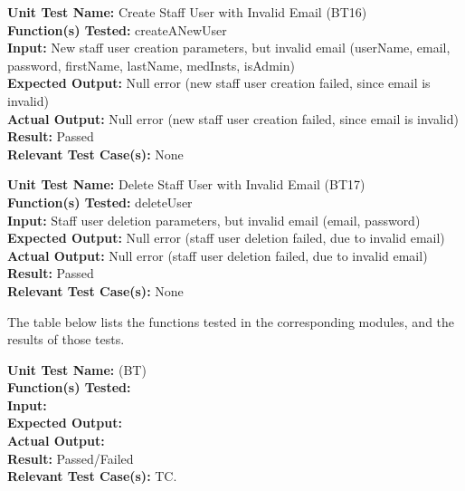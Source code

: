 \documentclass[12pt, titlepage]{article}
\begin{document}
\begin{mdframed}[linewidth=0.5mm]
  \textbf{Unit Test Name:} Create Staff User with Invalid Email (BT16) \\
  \textbf{Function(s) Tested:} createANewUser \\
  \textbf{Input:} New staff user creation parameters, but invalid email (userName, email, password, firstName, lastName, medInsts, isAdmin) \\
  \textbf{Expected Output:} Null error (new staff user creation failed, since email is invalid) \\
  \textbf{Actual Output:} Null error (new staff user creation failed, since email is invalid) \\
  \textbf{Result:} Passed \\
  \textbf{Relevant Test Case(s):} None
\end{mdframed}

\begin{mdframed}[linewidth=0.5mm]
  \textbf{Unit Test Name:} Delete Staff User with Invalid Email (BT17) \\
  \textbf{Function(s) Tested:} deleteUser \\
  \textbf{Input:} Staff user deletion parameters, but invalid email (email, password) \\
  \textbf{Expected Output:} Null error (staff user deletion failed, due to invalid email) \\
  \textbf{Actual Output:} Null error (staff user deletion failed, due to invalid email) \\
  \textbf{Result:} Passed \\
  \textbf{Relevant Test Case(s):} None
\end{mdframed}

The table below lists the functions tested in the corresponding modules, and the results of those tests.

\begin{mdframed}[linewidth=0.5mm]
  \textbf{Unit Test Name:}  (BT) \\
  \textbf{Function(s) Tested:}  \\
  \textbf{Input:}  \\
  \textbf{Expected Output:}  \\
  \textbf{Actual Output:}  \\
  \textbf{Result:} Passed/Failed \\
  \textbf{Relevant Test Case(s):} TC.
\end{mdframed}
\end{document}
